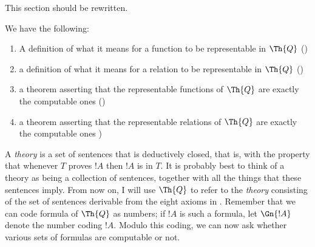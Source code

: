 \documentclass[../../../include/open-logic-section]{subfiles}
\begin{document}


\begin{editorial}
This section should be rewritten.  
\end{editorial}

We have the following:
\begin{enumerate}
\item A definition of what it means for a function to be representable
  in $\Th{Q}$ ()
\item a definition of what it means for a relation to be representable
  in $\Th{Q}$ ()
\item a theorem asserting that the representable functions of $\Th{Q}$
  are exactly the computable ones
  ()
\item a theorem asserting that the representable relations of $\Th{Q}$
  are exactly the computable ones
  )
\end{enumerate}

A {\em theory} is a set of sentences that is deductively closed, that
is, with the property that whenever $T$ proves $!A$ then $!A$ is in
$T$. It is probably best to think of a theory as being a collection of
sentences, together with all the things that these sentences imply.
From now on, I will use $\Th{Q}$ to refer to the {\em theory}
consisting of the set of sentences derivable from the eight axioms in
.  Remember that we can code formula of $\Th{Q}$
as numbers; if $!A$ is such a formula, let $\Gn{!A}$ denote the number
coding $!A$. Modulo this coding, we can now ask whether various sets
of formulas are computable or not.
\end{document}
